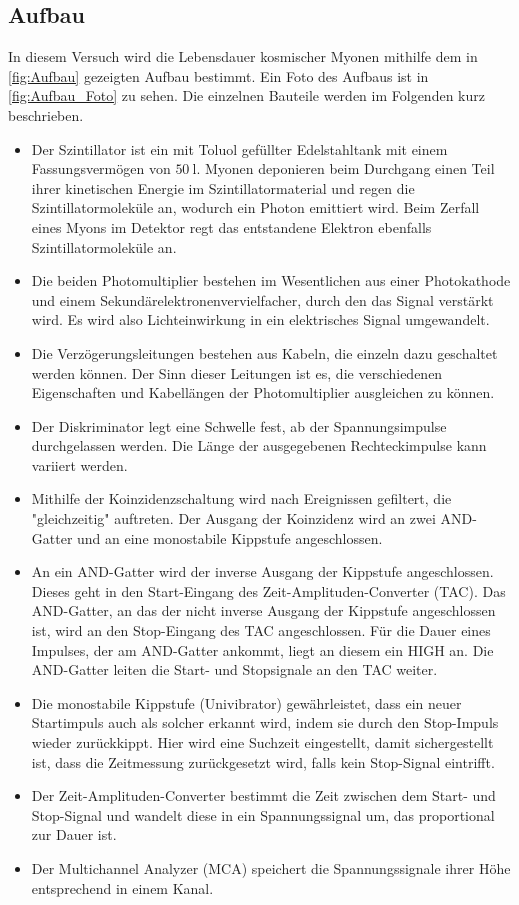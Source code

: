 \subsection{Aufbau}
In diesem Versuch wird die Lebensdauer kosmischer Myonen mithilfe dem in \autoref{fig:Aufbau} gezeigten Aufbau bestimmt. Ein Foto des Aufbaus ist in \autoref{fig:Aufbau_Foto} zu sehen. Die einzelnen Bauteile werden im Folgenden kurz beschrieben.
\begin{itemize}
    \item Der Szintillator ist ein mit Toluol gefüllter Edelstahltank mit einem Fassungsvermögen von $\SI{50}{\litre}$. Myonen deponieren beim Durchgang einen Teil ihrer kinetischen Energie im Szintillatormaterial und regen die Szintillatormoleküle an, wodurch ein Photon emittiert wird. Beim Zerfall eines Myons im Detektor regt das entstandene Elektron ebenfalls Szintillatormoleküle an. %
    \item Die beiden Photomultiplier bestehen im Wesentlichen aus einer Photokathode und einem Sekundärelektronenvervielfacher, durch den das Signal verstärkt wird. Es wird also Lichteinwirkung in ein elektrisches Signal umgewandelt.
    \item Die Verzögerungsleitungen bestehen aus Kabeln, die einzeln dazu geschaltet werden können. Der Sinn dieser Leitungen ist es, die verschiedenen Eigenschaften und Kabellängen der Photomultiplier ausgleichen zu können. %
    \item Der Diskriminator legt eine Schwelle fest, ab der Spannungsimpulse durchgelassen werden. Die Länge der ausgegebenen Rechteckimpulse kann variiert werden.
    \item Mithilfe der Koinzidenzschaltung wird nach Ereignissen gefiltert, die "gleichzeitig" auftreten. Der Ausgang der Koinzidenz wird an zwei AND-Gatter und an eine monostabile Kippstufe angeschlossen. %
    \item An ein AND-Gatter wird der inverse Ausgang der Kippstufe angeschlossen. Dieses geht in den Start-Eingang des Zeit-Amplituden-Converter (TAC). Das AND-Gatter, an das der nicht inverse Ausgang der Kippstufe angeschlossen ist, wird an den Stop-Eingang des TAC angeschlossen. Für die Dauer eines Impulses, der am AND-Gatter ankommt, liegt an diesem ein HIGH an. Die AND-Gatter leiten die Start- und Stopsignale an den TAC weiter. %
    \item Die monostabile Kippstufe (Univibrator) gewährleistet, dass ein neuer Startimpuls auch als solcher erkannt wird, indem sie durch den Stop-Impuls wieder zurückkippt. Hier wird eine Suchzeit eingestellt, damit sichergestellt ist, dass die Zeitmessung zurückgesetzt wird, falls kein Stop-Signal eintrifft. %
    \item Der Zeit-Amplituden-Converter bestimmt die Zeit zwischen dem Start- und Stop-Signal und wandelt diese in ein Spannungssignal um, das proportional zur Dauer ist.
    \item Der Multichannel Analyzer (MCA) speichert die Spannungssignale ihrer Höhe entsprechend in einem Kanal.
\end{itemize}

